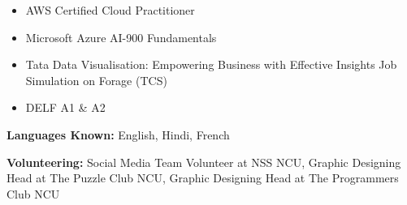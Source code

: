 \documentclass[10pt, letterpaper]{article}
\newenvironment{highlights}{
\begin{itemize}[topsep=0.10 cm,parsep=0.10 cm,partopsep=0pt,itemsep=0pt,leftmargin=0 cm + 10pt]
}{
\end{itemize}
}
\begin{document}
\textwidth %

\begin{paracol}{2}
\begin{highlights}
\item AWS Certified Cloud Practitioner
\item Microsoft Azure AI-900 Fundamentals
\item Tata Data Visualisation: Empowering Business with Effective Insights Job Simulation on Forage (TCS)
\item DELF A1 \& A2
\end{highlights}

\switchcolumn %

\textbf{Languages Known:} English, Hindi, French \par %
\vspace{0.1 cm} %
\textbf{Volunteering:} Social Media Team Volunteer at NSS NCU, Graphic Designing Head at The Puzzle Club NCU, Graphic Designing Head at The Programmers Club NCU
\end{paracol}

\end{document}
